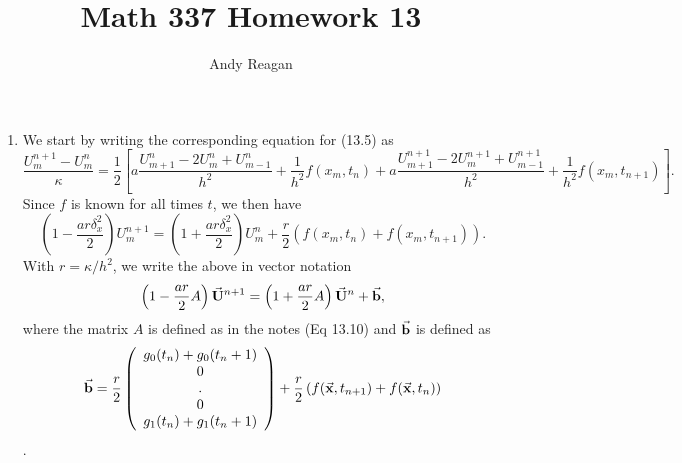 \documentclass[11pt]{article}
\author{Andy Reagan}
\title{Math 337 Homework 13}
\def\f{\frac }
\newcommand{\bvec}[1]{\vec{ {\bf #1 } }}
\begin{document}
\maketitle

\begin{enumerate}

\item We start by writing the corresponding equation for (13.5) as 
\[ \f{U_m ^{n+1} - U_m ^{n} }{\kappa}  = \f{1}{2} \left [ a\f{U_{m+1} ^n -2 U_{m} ^n +U_{m-1} ^n}{h^2} + \f{1}{h^2} f(x_m ,t_n ) + a\f{U_{m+1} ^{n+1} -2 U_{m} ^{n+1} +U_{m-1} ^{n+1}}{h^2} + \f{1}{h^2} f(x_m ,t_{n+1} ) \right ] .\]
Since $f$ is known for all times $t$, we then have 
\[ \left (1-\f{ar\delta_x ^2 }{2}\right )U_m ^{n+1} = \left (1+\f{ar\delta_x ^2 }{2}\right )U_m ^{n} + \f{r}{2} \left ( f(x_m ,t_n ) + f(x_m ,t_{n+1} ) \right )  .\]
With $r = \kappa / h^2$, we write the above in vector notation 
\[ \left (1-\f{ar}{2}A\right )\bvec{U} ^{n+1} = \left (1+\f{ar}{2}A\right )\bvec{U} ^{n} + \bvec{b},\]
where the matrix $A$ is defined as in the notes (Eq 13.10) and $\bvec{b}$ is defined as
\[ \bvec{b} = \f{r}{2} \left ( \begin{array}{c} g_0 (t_n) + g_0(t_n+1) \\0\\.\\0\\ g_1 (t_n) + g_1(t_n+1) \end{array} \right ) + \f{r}{2} \left ( f( \bvec{x} ,t_{n+1} ) + f( \bvec{x} , t_n ) \right ) \].


\end{enumerate}
\end{document}
